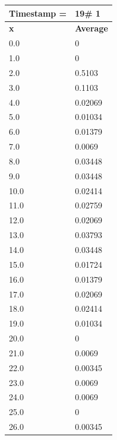 \begin{tabular}{|l||l|}
\hline
\textbf{Timestamp =} & \textbf{19}\# 1\\\hline
	\textbf{x} & \textbf{Average} \\ \hline
\hline
	0.0 & 0 \\ \hline
	1.0 & 0 \\ \hline
	2.0 & 0.5103 \\ \hline
	3.0 & 0.1103 \\ \hline
	4.0 & 0.02069 \\ \hline
	5.0 & 0.01034 \\ \hline
	6.0 & 0.01379 \\ \hline
	7.0 & 0.0069 \\ \hline
	8.0 & 0.03448 \\ \hline
	9.0 & 0.03448 \\ \hline
	10.0 & 0.02414 \\ \hline
	11.0 & 0.02759 \\ \hline
	12.0 & 0.02069 \\ \hline
	13.0 & 0.03793 \\ \hline
	14.0 & 0.03448 \\ \hline
	15.0 & 0.01724 \\ \hline
	16.0 & 0.01379 \\ \hline
	17.0 & 0.02069 \\ \hline
	18.0 & 0.02414 \\ \hline
	19.0 & 0.01034 \\ \hline
	20.0 & 0 \\ \hline
	21.0 & 0.0069 \\ \hline
	22.0 & 0.00345 \\ \hline
	23.0 & 0.0069 \\ \hline
	24.0 & 0.0069 \\ \hline
	25.0 & 0 \\ \hline
	26.0 & 0.00345 \\ \hline
\end{tabular}

